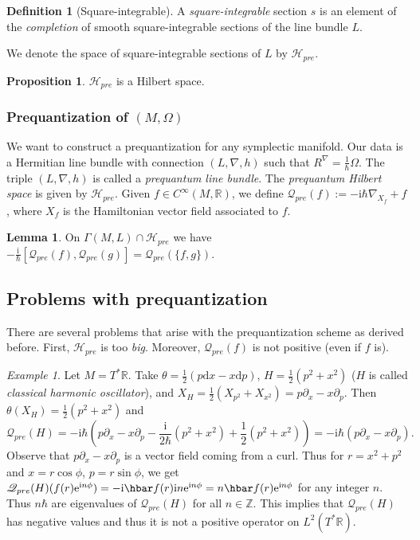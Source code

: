 \documentclass[12pt]{amsart}
\numberwithin{equation}{section}
\theoremstyle{plain}
\theoremstyle{definition}
\newtheorem{defn}{Definition}[subsection]
\newtheorem{prop}{Proposition}[subsection]
\newtheorem{lem}{Lemma}[subsection]
\theoremstyle{remark}
\newtheorem{ex}{Example}[subsection]
\newcommand{\R}{\mathbb{R}}
\newcommand{\dd}{{\mathrm{d}}}
\newcommand{\calH}{\mathcal{H}}
\newcommand{\I}{\mathrm{i}}
\newcommand{\ee}{\textnormal{e}}
\begin{document}
\begin{defn}[Square-integrable]
A \emph{square-integrable} section $s$ is an element of the \emph{completion} of smooth square-integrable sections of the line bundle $L$.
\end{defn}
We denote the space of square-integrable sections of $L$ by $\calH_{pre}$.

\begin{prop}
$\calH_{pre}$ is a Hilbert space.
\end{prop}

\subsubsection{Prequantization of $(M,\Omega)$}
We want to construct a prequantization for any symplectic manifold. Our data is a Hermitian line bundle with connection $(L,\nabla,h)$ such that $R^\nabla=\frac{1}{\hbar}\Omega$. The triple $(L,\nabla,h)$ is called a \emph{prequantum line bundle}. The \emph{prequantum Hilbert space} is given by $\calH_{pre}$. Given $f\in C^\infty(M,\R)$, we define $\mathscr{Q}_{pre}(f):=-\I\hbar\nabla_{X_f}+f$, where $X_f$ is the Hamiltonian vector field associated to $f$.


\begin{lem}
On $\Gamma(M,L)\cap\calH_{pre}$ we have $-\frac{\I}{\hbar}[\mathscr{Q}_{pre}(f),\mathscr{Q}_{pre}(g)]=\mathscr{Q}_{pre}(\{f,g\})$.
\end{lem}

\subsection{Problems with prequantization}
There are several problems that arise with the prequantization scheme as derived before. First, $\calH_{pre}$ is too \emph{big}. Moreover, $\mathscr{Q}_{pre}(f)$ is not positive (even if $f$ is).

\begin{ex}
Let $M=T^*\R$. Take $\theta=\frac{1}{2}(p\dd x-x\dd p)$, $H=\frac{1}{2}(p^2+x^2)$ ($H$ is called \emph{classical harmonic oscillator}), and $X_H=\frac{1}{2}(X_{p^2}+X_{x^2})=p\partial_x-x\partial_p$. Then $\theta(X_H)=\frac{1}{2}(p^2+x^2)$ and 
\[
\mathscr{Q}_{pre}(H)=-\I\hbar\left(p\partial_x-x\partial_p-\frac{\I}{2\hbar}(p^2+x^2)+\frac{1}{2}(p^2+x^2)\right)=-\I\hbar(p\partial_x-x\partial_p).
\]
Observe that $p\partial_x-x\partial_p$ is a vector field coming from a curl. Thus  for $r=x^2+p^2$ and $x=r\cos\phi$, $p=r\sin\phi$, we get $\mathscr{Q}_{pre}(H)(f(r)\ee^{\I n\phi})=-\I\hbar f(r)\I n\ee^{\I n\phi}=n\hbar f(r)\ee^{\I n\phi}$ for any integer $n$. Thus $n\hbar$ are eigenvalues of $\mathscr{Q}_{pre}(H)$ for all $n\in\mathbb{Z}$. This implies that $\mathscr{Q}_{pre}(H)$ has negative values and thus it is not a positive operator on $L^2(T^*\R)$.
\end{ex}
\end{document}
